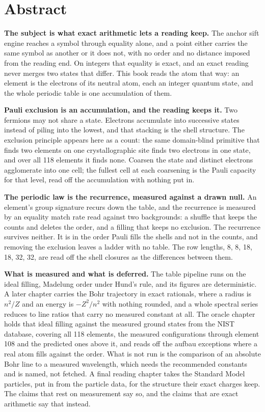 \chapter*{Abstract}

\textbf{The subject is what exact arithmetic lets a reading keep.} The anchor sift engine reaches a
symbol through equality alone, and a point either carries the same symbol as another or it does not,
with no order and no distance imposed from the reading end. On integers that equality is exact, and
an exact reading never merges two states that differ. This book reads the atom that way: an element
is the electrons of its neutral atom, each an integer quantum state, and the whole periodic table is
one accumulation of them.

\textbf{Pauli exclusion is an accumulation, and the reading keeps it.} Two fermions may not share a
state. Electrons accumulate into successive states instead of piling into the lowest, and that
stacking is the shell structure. The exclusion principle appears here as a count: the same
domain-blind primitive that finds two elements on one crystallographic site finds two electrons in
one state, and over all 118 elements it finds none. Coarsen the state and distinct electrons
agglomerate into one cell; the fullest cell at each coarsening is the Pauli capacity for that level,
read off the accumulation with nothing put in.

\textbf{The periodic law is the recurrence, measured against a drawn null.} An element's group
signature recurs down the table, and the recurrence is measured by an equality match rate read
against two backgrounds: a shuffle that keeps the counts and deletes the order, and a filling that
keeps no exclusion. The recurrence survives neither. It is in the order Pauli fills the shells and
not in the counts, and removing the exclusion leaves a ladder with no table. The row lengths, 8, 8,
18, 18, 32, 32, are read off the shell closures as the differences between them.

\textbf{What is measured and what is deferred.} The table pipeline runs on the ideal filling,
Madelung order under Hund's rule, and its figures are deterministic. A later chapter carries the Bohr
trajectory in exact rationals, where a radius is $n^2/Z$ and an energy is $-Z^2/n^2$ with nothing
rounded, and a whole spectral series reduces to line ratios that carry no measured constant at all.
The oracle chapter holds that ideal filling against the measured ground states from the NIST database,
covering all 118 elements, the measured configurations through element 108 and the predicted ones
above it, and reads off the aufbau exceptions where a real atom fills against the order. What is not
run is the comparison of an absolute Bohr line to a measured wavelength, which needs the recommended
constants and is named, not fetched. A final reading chapter takes the Standard Model particles, put
in from the particle data, for the structure their exact charges keep. The claims that rest on
measurement say so, and the claims that are exact arithmetic say that instead.
